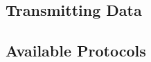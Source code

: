 
\subsection{Transmitting Data}
\label{sec:p2p_data_transmit}



\subsection{Available Protocols}
\label{sec:p2p_protocols}


